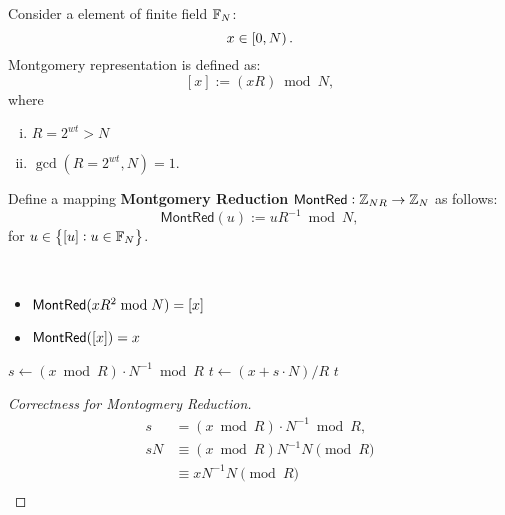 \begin{tcolorbox}[colframe=defcolor,title={\color{white}\bf Montgomery From}]
\begin{definition}
Consider a element of finite field $\mathbb{F}_N$: \[
x\in\intco{0,N}.
\] Montgomery representation is defined as: \[
[x]:=(xR)\bmod N,
\] where \begin{enumerate}[(i)]
\item $R=2^{wt}>N$
\item $\gcd(R=2^{wt}, N)=1$.
\end{enumerate}
\end{definition}	
\end{tcolorbox}

\begin{tcolorbox}[colframe=defcolor,title={\color{white}\bf Montgomery Reduction}]
\begin{definition}
Define a mapping \textbf{Montgomery Reduction} $\mathsf{MontRed}:\mathbb{Z}_{NR}\to\mathbb{Z}_{N}$ as follows: \[
\mathsf{MontRed}(u):=uR^{-1}\bmod N,
\] for $u\in\set{[u]: u\in \mathbb{F}_N}$.
\end{definition}	
\end{tcolorbox}
\begin{remark}
\ \begin{itemize}
\item $\mathsf{MontRed} (xR^2\bmod N)=[x]$
\item $\mathsf{MontRed} ([x])=x$
\end{itemize}
\end{remark}

\begin{algorithm}[H]
\DontPrintSemicolon
\caption{Montgomery Reduction: $\MontRed(x)=xR^{-1}\bmod N$}
\BlankLine
{}
\BlankLine
$s\gets(x\bmod R)\cdot N^{-1}\bmod R$
$t\gets(x+s\cdot N) / R$
 \Return $t$\;
\end{algorithm}
\begin{proof}[Correctness for Montogmery Reduction]
\begin{align*}
s&=(x\bmod R)\cdot N^{-1}\bmod R, \\
sN&\equiv (x\bmod R)N^{-1}N\pmod R \\
&\equiv xN^{-1}N\pmod R \\
\end{align*}
\end{proof}


